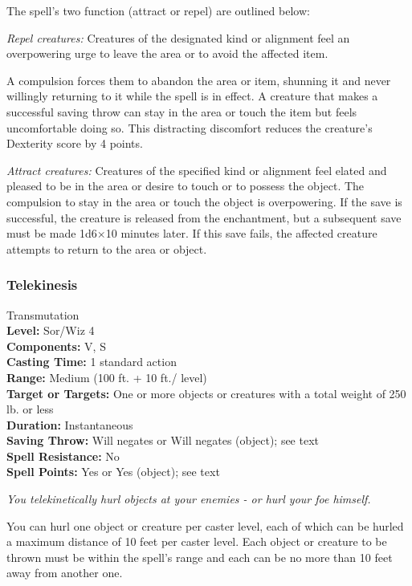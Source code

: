 The spell's two function (attract or repel) are outlined below:
\begin{list}{}{\leftmargin=1em}
 \item \emph{Repel creatures:} Creatures of the designated kind or alignment feel an overpowering urge to leave the area or to avoid the affected item.

A compulsion forces them to abandon the area or item, shunning it and never willingly returning to it while the spell is in effect. 
A creature that makes a successful saving throw can stay in the area or touch the item but feels uncomfortable doing so. 
This distracting discomfort reduces the creature's Dexterity score by 4 points.
 \item \emph{Attract creatures:} Creatures of the specified kind or alignment feel elated and pleased to be in the area or desire to touch or to possess the object. 
The compulsion to stay in the area or touch the object is overpowering. 
If the save is successful, the creature is released from the enchantment, but a subsequent save must be made 1d6$\times$10 minutes later. 
If this save fails, the affected creature attempts to return to the area or object.
\end{list}
\subsubsection{Telekinesis}
\label{Spell:Telekinesis}
Transmutation
\\ \textbf{Level:} Sor/Wiz 4
\\ \textbf{Components:} V, S
\\ \textbf{Casting Time:} 1 standard action
\\ \textbf{Range:} Medium (100 ft. + 10 ft./ level)
\\ \textbf{Target or Targets:} One or more objects or creatures with a total weight of 250 lb. or less
\\ \textbf{Duration:} Instantaneous
\\ \textbf{Saving Throw:} Will negates or Will negates (object); see text
\\ \textbf{Spell Resistance:} No
\\ \textbf{Spell Points:} Yes or Yes (object); see text

\emph{You telekinetically hurl objects at your enemies - or hurl your foe himself.}

You can hurl one object or creature per caster level, each of which can be hurled a maximum distance of 10 feet per caster level.
Each object or creature to be thrown must be within the spell's range and each can be no more than 10 feet away from another one. 

